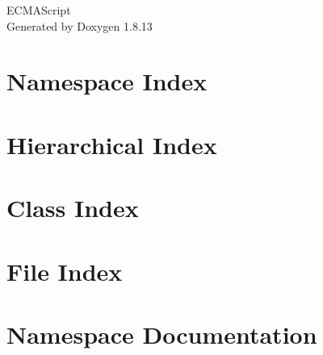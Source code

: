 \documentclass[twoside]{book}
\newcommand{\+}{\discretionary{\mbox{\scriptsize$\hookleftarrow$}}{}{}}
\newcommand{\clearemptydoublepage}{%
  \newpage{\pagestyle{empty}\cleardoublepage}%
}
\begin{document}
\hypersetup{pageanchor=false,
             bookmarksnumbered=true,
             pdfencoding=unicode
            }
\begin{titlepage}
\vspace*{7cm}
\begin{center}%
{\Large E\+C\+M\+A\+Script }\\
\vspace*{1cm}
{\large Generated by Doxygen 1.8.13}\\
\end{center}
\end{titlepage}
\clearemptydoublepage
{}
\tableofcontents
\clearemptydoublepage
{}
\hypersetup{pageanchor=true}

\chapter{Namespace Index}

\chapter{Hierarchical Index}

\chapter{Class Index}

\chapter{File Index}

\chapter{Namespace Documentation}









\end{document}
